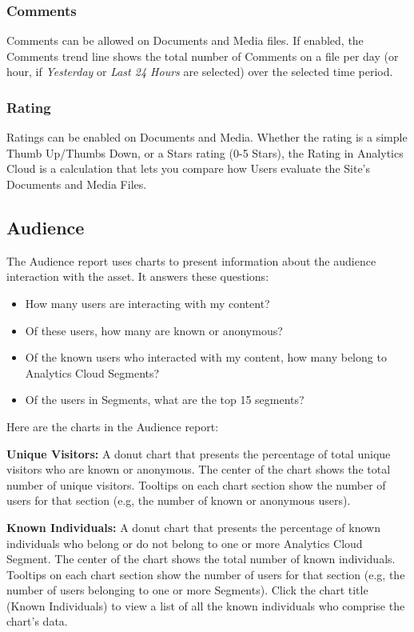 \subsubsection{Comments}\label{comments-1}

Comments can be allowed on Documents and Media files. If enabled, the
Comments trend line shows the total number of Comments on a file per day
(or hour, if \emph{Yesterday} or \emph{Last 24 Hours} are selected) over
the selected time period.

\subsubsection{Rating}\label{rating-1}

Ratings can be enabled on Documents and Media. Whether the rating is a
simple Thumb Up/Thumbs Down, or a Stars rating (0-5 Stars), the Rating
in Analytics Cloud is a calculation that lets you compare how Users
evaluate the Site's Documents and Media Files.

\subsection{Audience}\label{audience-3}

The Audience report uses charts to present information about the
audience interaction with the asset. It answers these questions:

\begin{itemize}
\tightlist
\item
  How many users are interacting with my content?
\item
  Of these users, how many are known or anonymous?
\item
  Of the known users who interacted with my content, how many belong to
  Analytics Cloud Segments?
\item
  Of the users in Segments, what are the top 15 segments?
\end{itemize}

Here are the charts in the Audience report:

\textbf{Unique Visitors:} A donut chart that presents the percentage of
total unique visitors who are known or anonymous. The center of the
chart shows the total number of unique visitors. Tooltips on each chart
section show the number of users for that section (e.g, the number of
known or anonymous users).

\textbf{Known Individuals:} A donut chart that presents the percentage
of known individuals who belong or do not belong to one or more
Analytics Cloud Segment. The center of the chart shows the total number
of known individuals. Tooltips on each chart section show the number of
users for that section (e.g, the number of users belonging to one or
more Segments). Click the chart title (Known Individuals) to view a list
of all the known individuals who comprise the chart's data.

